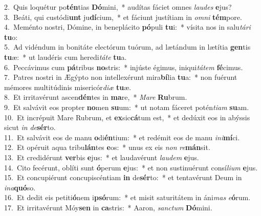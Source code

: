 {2.~}Quis loquétur po\textbf{tén}tias \textbf{Dó}mini,~* audítas fáciet omnes \textit{lau}\textit{des} \textbf{e}jus?\\
{3.~}Beáti, qui custódi\textbf{unt} ju\textbf{dí}cium,~* et fáciunt justítiam in \textit{om}\textit{ni} \textbf{tém}pore.\\
{4.~}Meménto nostri, Dómine, in beneplácito \textbf{pó}puli \textbf{tu}i:~* vísita nos in salu\textit{tá}\textit{ri} \textbf{tu}o:\\
{5.~}Ad vidéndum in bonitáte electórum tuórum, ad lætándum in lætítia \textbf{gen}tis \textbf{tu}æ:~* ut laudéris cum heredi\textit{tá}\textit{te} \textbf{tu}a.\\
{6.~}Peccávimus cum \textbf{pá}tribus \textbf{no}stris:~* injúste égimus, iniqui\textit{tá}\textit{tem} \textbf{fé}cimus.\\
{7.~}Patres nostri in Ægýpto non intellexérunt mira\textbf{bí}lia \textbf{tu}a:~* non fuérunt mémores multitúdinis misericór\textit{di}\textit{æ} \textbf{tu}æ.\\
{8.~}Et irritavérunt ascen\textbf{dén}tes in \textbf{ma}re,~* \textit{Ma}\textit{re} \textbf{Ru}brum.\\
{9.~}Et salvávit eos propter \textbf{no}men \textbf{su}um:~* ut notam fáceret potén\textit{ti}\textit{am} \textbf{su}am.\\
{10.~}Et incrépuit Mare Rubrum, et \textbf{ex}sic\textbf{cá}tum est,~* et dedúxit eos in abýssis sicut \textit{in} \textit{de}\textbf{sér}to.\\
{11.~}Et salvávit eos de manu \textbf{o}di\textbf{én}tium:~* et redémit eos de manu \textit{i}\textit{ni}\textbf{mí}ci.\\
{12.~}Et opéruit aqua tribu\textbf{lán}tes \textbf{e}os:~* unus ex eis \textit{non} \textit{re}\textbf{mán}sit.\\
{13.~}Et credidérunt \textbf{ver}bis \textbf{e}jus:~* et laudavérunt \textit{lau}\textit{dem} \textbf{e}jus.\\
{14.~}Cito fecérunt, oblíti sunt \textbf{ó}perum \textbf{e}jus:~* et non sustinuérunt consí\textit{li}\textit{um} \textbf{e}jus.\\
{15.~}Et concupiérunt concupiscéntiam \textbf{in} de\textbf{sér}to:~* et tentavérunt Deum in \textit{i}\textit{na}\textbf{quó}so.\\
{16.~}Et dedit eis petiti\textbf{ó}nem i\textbf{psó}rum:~* et misit saturitátem in áni\textit{mas} \textit{e}\textbf{ó}rum.\\
{17.~}Et irritavérunt Móy\textbf{sen} in \textbf{ca}stris:~* Aaron, \textit{san}\textit{ctum} \textbf{Dó}mini.\\
